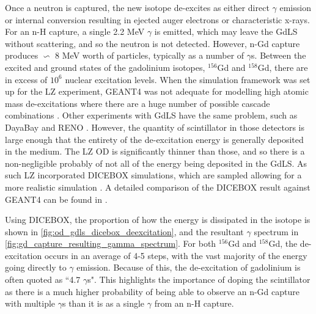 \par
Once a neutron is captured, the new isotope de-excites as either direct $\gamma$ emission or internal conversion resulting in ejected auger electrons or characteristic x-rays.
For an n-H capture, a single 2.2 MeV $\gamma$ is emitted, which may leave the GdLS without scattering, and so the neutron is not detected.
However, n-Gd capture produces $\backsim$ 8 MeV worth of particles, typically as a number of $\gamma$s.
Between the excited and ground states of the gadolinium isotopes, ${}^{156}$Gd and ${}^{158}$Gd, there are in excess of $10^{6}$ nuclear excitation levels.
When the simulation framework was set up for the LZ experiment, GEANT4 was not adequate for modelling high atomic mass de-excitations where there are a huge number of possible cascade combinations \cite{ucsb_gdls_dicebox_simulations_ref}.
Other experiments with GdLS have the same problem, such as DayaBay \cite{dayabay_overview_ref} and RENO \cite{reno_overview_ref}.
However, the quantity of scintillator in those detectors is large enough that the entirety of the de-excitation energy is generally deposited in the medium.
The LZ OD is significantly thinner than those, and so there is a non-negligible probably of not all of the energy being deposited in the GdLS.
As such LZ incorporated DICEBOX \cite{dicebox_simulations_ref} simulations, which are sampled allowing for a more realistic simulation \cite{lz_simulations_ref}.
A detailed comparison of the DICEBOX result against GEANT4 can be found in \cite{ucsb_gdls_dicebox_simulations_ref}.
\par
Using DICEBOX, the proportion of how the energy is dissipated in the isotope is shown in \autoref{fig:od_gdls_dicebox_deexcitation}, and the resultant $\gamma$ spectrum in \autoref{fig:gd_capture_resulting_gamma_spectrum}.
For both ${}^{156}$Gd and ${}^{158}$Gd, the de-excitation occurs in an average of 4-5 steps, with the vast majority of the energy going directly to $\gamma$ emission.
Because of this, the de-excitation of gadolinium is often quoted as ``4.7 $\gamma$s".
This highlights the importance of doping the scintillator as there is a much higher probability of being able to observe an n-Gd capture with multiple $\gamma$s than it is as a single $\gamma$ from an n-H capture.



